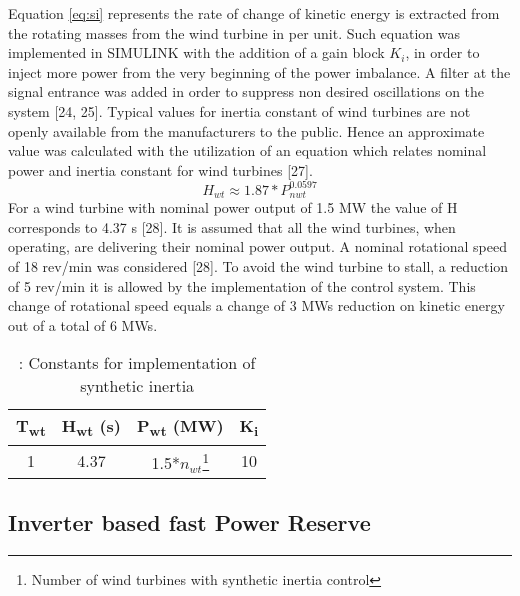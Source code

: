 Equation \eqref{eq:si} represents the rate of change of kinetic energy is extracted from the rotating masses from the wind turbine in per unit. Such equation was implemented in SIMULINK with the addition of a gain block $K_i$, in order to inject more power from the very beginning of the power imbalance. A filter at the signal entrance was added in order to suppress non desired oscillations on the system [24, 25].
Typical values for inertia constant of wind turbines are not openly available from the manufacturers to the public. Hence an approximate value was calculated with the utilization of an equation which relates nominal power and inertia constant for wind turbines [27].
\begin{equation}
	\label{eq:wtinertia}
	H_{wt}\approx1.87*P_{nwt}^{0.0597}
\end{equation}
For a wind turbine with nominal power output of 1.5 MW the value of H corresponds to 4.37 s [28].
It is assumed that all the wind turbines, when operating, are delivering their nominal power output. A nominal rotational speed of 18 rev/min was considered [28]. To avoid the wind turbine to stall, a reduction of 5 rev/min it is allowed by the implementation of the control system. This change of rotational speed equals a change of 3 MWs reduction on kinetic energy out of a total of 6 MWs.

\begin{table}[h]
	\caption{\label{tb:inertia}: Constants for implementation of synthetic inertia}
	\centering
	\begin{tabular}{cccc}
		\toprule
		\textbf{T\textsubscript{wt}} 	& \textbf{ H\textsubscript{wt} (s)}	& \textbf{ P\textsubscript{wt} (MW)}  & \textbf{ K\textsubscript{i}} \\
		\midrule
			1	       & 4.37		        &  1.5*$ n_{wt} $\footnote{Number of wind turbines with synthetic inertia control} & 10 \\
		\bottomrule
	\end{tabular}
\end{table}

\subsection{Inverter based fast Power Reserve}


